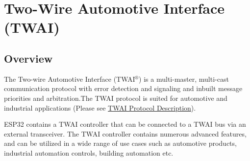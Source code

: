 \documentclass[main\_\_EN.tex]{subfiles}
\begin{document}
\setenglishformatting

\ifglobal
\else
    \listoftodos
    {\let\clearpage\relax \listofdonetodos}
    \tableofcontents
\fi



\hypertarget{twai}{}
\chapter{Two-Wire Automotive Interface (TWAI)}
\label{mod:twai}

\section{Overview}

The Two-wire Automotive Interface (TWAI$^\circledR$) is a multi-master, multi-cast communication protocol with error detection and signaling and inbuilt message priorities and arbitration.The TWAI protocol is suited for automotive and industrial applications (Please see \hyperref[subsec:protocol-description]{TWAI Protocol Description}).

ESP32 contains a TWAI controller that can be connected to a TWAI bus via an external transceiver. The TWAI controller contains numerous advanced features, and can be utilized in a wide range of use cases such as automotive products, industrial automation controls, building automation etc.
\end{document}
